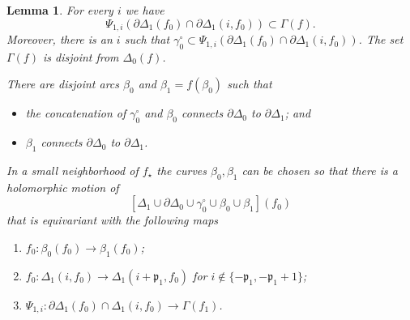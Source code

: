 \documentclass[]{amsart}
\newcommand{\bDelta}{{\mathbb{\Delta}}}
\newcommand{\str}{{\star}}
\newcommand{\pp}{\mathfrak{p}}
\newtheorem{lem}[thm]{Lemma}
\theoremstyle{remark}
\numberwithin{equation}{section}
\theoremstyle{definition}
\begin{document}
\begin{lem}
\label{lem:InitHolMotion}
For every $i$ we have 
\[  \Psi_{1,i}(\partial \bDelta_1(f_0)\cap \partial \Delta_1(i,f_0))\subset \Gamma(f).\]
Moreover, there is an $i$ such that $\gamma_0^\circ\subset  \Psi_{1,i}(\partial \bDelta_1(f_0)\cap \partial \Delta_1(i,f_0))$. The set $\Gamma(f)$ is disjoint from $\bDelta_0(f)$.


There are disjoint arcs $\beta_0$ and $\beta_1=f(\beta_0)$ such that
\begin{itemize}
\item the concatenation of $\gamma^\circ_0$ and $\beta_0$ connects $\partial \bDelta_0$ to $\partial \bDelta_1$; and
\item $\beta_1$ connects $\partial \bDelta_0$ to $\partial \bDelta_1$.
\end{itemize}
In a small neighborhood of $f_\str$ the curves $\beta_0,\beta_1$ can be chosen so that there is a holomorphic motion of 
\begin{equation}
\label{eq:0:lem:InitHolMotion}
\left[\bDelta_1\cup \partial \bDelta_0\cup \gamma^\circ_0\cup \beta_0\cup\beta_1\right] (f_0)
\end{equation} that is \emph{equivariant} with the following maps
\begin{enumerate}
\item $f_0\colon \beta_0(f_0)\to \beta_1(f_0)$;\label{eq:1:lem:InitHolMotion}
\item $f_0\colon \Delta_1(i,f_0)\to \Delta_1(i+\pp_1,f_0)$ for $i\not \in \{-\pp_1,-\pp_1+1\}$;\label{eq:2:lem:InitHolMotion}
\item $\Psi_{1,i}\colon \partial \bDelta_1(f_0)\cap \Delta_1(i,f_0)\to \Gamma(f_1)$.\label{eq:3:lem:InitHolMotion}
\end{enumerate}
\end{lem}
\end{document}
